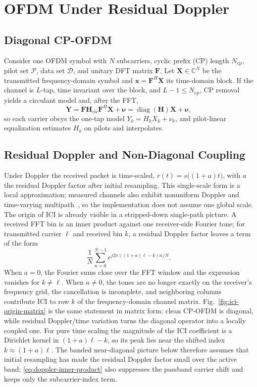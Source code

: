 \documentclass[journal]{IEEEtran}
\newcommand{\C}{\mathbb{C}}
\newcommand{\Ht}{^{H}}
\begin{document}
\section{OFDM Under Residual Doppler}\label{sec:model}
\subsection{Diagonal CP-OFDM}
Consider one OFDM symbol with $N$ subcarriers, cyclic prefix (CP) length
$N_{\mathrm{cp}}$, pilot set $\mathcal P$, data set $\mathcal D$, and unitary DFT
matrix $\mathbf F$. Let $\mathbf X\in\C^N$ be the transmitted frequency-domain
symbol and $\mathbf x=\mathbf F\Ht\mathbf X$ its time-domain block. If the
channel is $L$-tap, time invariant over the block, and $L-1\le N_{\mathrm{cp}}$,
CP removal yields a circulant model and, after the FFT,
\begin{equation}
  \mathbf Y=\mathbf F\mathbf H_{\mathrm{cir}}\mathbf F\Ht\mathbf X+\bm\nu
  =\operatorname{diag}(\mathbf H)\mathbf X+\bm\nu,
  \label{eq:diagonal-ofdm}
\end{equation}
so each carrier obeys the one-tap model $Y_k=H_kX_k+\nu_k$, and pilot-linear
equalization estimates $H_k$ on pilots and interpolates.

\subsection{Residual Doppler and Non-Diagonal Coupling}
Under Doppler the received packet is time-scaled, $r(t)=s\big((1+a)t\big)$, with
$a$ the residual Doppler factor after initial resampling. This single-scale form is a
local approximation; measured channels also exhibit nonuniform Doppler and
time-varying multipath~\cite{li2008nonuniform}, so the implementation does not
assume one global scale. The origin of ICI is already visible in a stripped-down
single-path picture. A received FFT bin is an inner product against one
receiver-side Fourier tone; for transmitted carrier $\ell$ and received bin $k$,
a residual Doppler factor leaves a term of the form
\begin{equation}
  \frac{1}{N}\sum_{n=0}^{N-1}
  e^{j2\pi((1+a)\ell-k)n/N}.
  \label{eq:doppler-inner-product}
\end{equation}
When $a=0$, the Fourier sums close over the FFT window and the expression
vanishes for $k\ne\ell$. When $a\ne0$, the tones are no longer exactly on the
receiver's frequency grid, the cancellation is incomplete, and neighboring
columns contribute ICI to row $k$ of the frequency-domain channel matrix. Fig.~\ref{fig:ici-origin-matrix}
is the same statement in matrix form: clean CP-OFDM is diagonal, while residual
Doppler/time variation turns the diagonal operator into a locally coupled one.
For pure time scaling the magnitude of the ICI coefficient is a Dirichlet kernel in
$(1+a)\ell-k$, so its peak lies near the shifted index
$k\approx(1+a)\ell$. The banded near-diagonal picture below therefore assumes
that initial resampling has made the residual Doppler factor small over the active
band; \eqref{eq:doppler-inner-product} also suppresses the passband carrier
shift and keeps only the subcarrier-index term.
\end{document}

